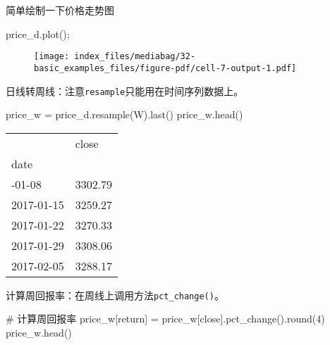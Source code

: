 \documentclass[
  letterpaper,
  DIV=11,
  numbers=noendperiod]{scrreprt}
\newenvironment{Shaded}{\begin{snugshade}}{\end{snugshade}}
\newcommand{\BuiltInTok}[1]{\textcolor[rgb]{0.00,0.23,0.31}{#1}}
\newcommand{\CommentTok}[1]{\textcolor[rgb]{0.37,0.37,0.37}{#1}}
\newcommand{\DecValTok}[1]{\textcolor[rgb]{0.68,0.00,0.00}{#1}}
\newcommand{\NormalTok}[1]{\textcolor[rgb]{0.00,0.23,0.31}{#1}}
\newcommand{\OperatorTok}[1]{\textcolor[rgb]{0.37,0.37,0.37}{#1}}
\newcommand{\StringTok}[1]{\textcolor[rgb]{0.13,0.47,0.30}{#1}}
\begin{document}
简单绘制一下价格走势图

\begin{Shaded}
\begin{Highlighting}[]
\NormalTok{price\_d.plot()}\OperatorTok{;}
\end{Highlighting}
\end{Shaded}

\begin{figure}[H]

{\centering \texttt{[image: index\_files/mediabag/32-basic\_examples\_files/figure-pdf/cell-7-output-1.pdf]}

}

\end{figure}

日线转周线：注意\texttt{resample}只能用在时间序列数据上。

\begin{Shaded}
\begin{Highlighting}[]
\NormalTok{price\_w }\OperatorTok{=}\NormalTok{ price\_d.resample(}\StringTok{\textquotesingle{}W\textquotesingle{}}\NormalTok{).last()}
\NormalTok{price\_w.head()}
\end{Highlighting}
\end{Shaded}

\begin{longtable}[]{@{}ll@{}}
\toprule\noalign{}
& close \\
date & \\
\midrule\noalign{}
\endhead
\bottomrule\noalign{}
\endlastfoot
2017-01-08 & 3302.79 \\
2017-01-15 & 3259.27 \\
2017-01-22 & 3270.33 \\
2017-01-29 & 3308.06 \\
2017-02-05 & 3288.17 \\
\end{longtable}

计算周回报率：在周线上调用方法\texttt{pct\_change()}。

\begin{Shaded}
\begin{Highlighting}[]
\CommentTok{\# 计算周回报率}
\NormalTok{price\_w[}\StringTok{\textquotesingle{}return\textquotesingle{}}\NormalTok{] }\OperatorTok{=}\NormalTok{ price\_w[}\StringTok{\textquotesingle{}close\textquotesingle{}}\NormalTok{].pct\_change().}\BuiltInTok{round}\NormalTok{(}\DecValTok{4}\NormalTok{)}
\NormalTok{price\_w.head()}
\end{Highlighting}
\end{Shaded}
\end{document}
